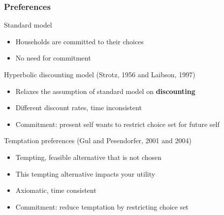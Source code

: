 \documentclass[10pt,english,t,10pt]{beamer}
\begin{document}
\begin{frame}[label=Preferences]
\frametitle{Preferences}



Standard model
\begin{itemize}
\item Households are committed to their choices
\item No need for commitment
\end{itemize}
\medskip \medskip 
\pause

Hyperbolic discounting model (Strotz, 1956 and Laibson, 1997)
\begin{itemize}
\item Relaxes the assumption of standard model on {\bf discounting}
\item Different discount rates, time inconsistent
\item Commitment: present self wants to restrict choice set for future self
\end{itemize}
\medskip \medskip 
\pause


Temptation preferences (Gul and Pesendorfer, 2001 and 2004)
\begin{itemize}
\item Tempting, feasible alternative that is not chosen
\item This tempting alternative impacts your utility
\item Axiomatic, time consistent
\item Commitment: reduce temptation by restricting choice set
\end{itemize}

\end{frame}
\end{document}
